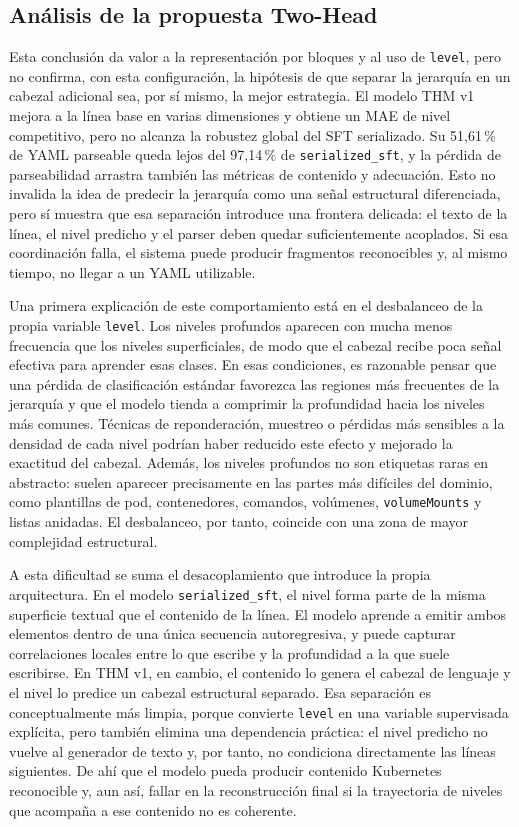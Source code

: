 \subsection{Análisis de la propuesta Two-Head}

Esta conclusión da valor a la representación por bloques y al uso de \texttt{level}, pero
no confirma, con esta configuración, la hipótesis de que separar la jerarquía en un cabezal adicional sea,
por sí mismo, la mejor estrategia. El modelo THM v1 mejora a la línea base en varias
dimensiones y obtiene un MAE de nivel competitivo, pero no alcanza la robustez global del
SFT serializado. Su 51{,}61\,\% de YAML parseable queda lejos del 97{,}14\,\% de
\texttt{serialized\_sft}, y la pérdida de parseabilidad arrastra también las métricas de
contenido y adecuación. Esto no invalida la idea de predecir la jerarquía como una señal
estructural diferenciada, pero sí muestra que esa separación introduce una frontera
delicada: el texto de la línea, el nivel predicho y el parser deben quedar suficientemente
acoplados. Si esa coordinación falla, el sistema puede producir fragmentos reconocibles y,
al mismo tiempo, no llegar a un YAML utilizable.

Una primera explicación de este comportamiento está en el desbalanceo de la propia variable
\texttt{level}. Los niveles profundos aparecen con mucha menos frecuencia que los niveles
superficiales, de modo que el cabezal recibe poca señal efectiva para aprender esas clases.
En esas condiciones, es razonable pensar que una pérdida de clasificación estándar favorezca
las regiones más frecuentes de la jerarquía y que el modelo tienda a comprimir la profundidad
hacia los niveles más comunes. Técnicas de reponderación, muestreo o pérdidas más sensibles a la
densidad de cada nivel podrían haber reducido este efecto y mejorado la exactitud del cabezal. Además, los
niveles profundos no son etiquetas raras en abstracto: suelen aparecer precisamente en las
partes más difíciles del dominio, como plantillas de pod, contenedores, comandos, volúmenes,
\texttt{volumeMounts} y listas anidadas. El desbalanceo, por tanto, coincide con una zona de
mayor complejidad estructural.

A esta dificultad se suma el desacoplamiento que introduce la propia arquitectura. En el modelo
\texttt{serialized\_sft}, el nivel forma parte de la misma superficie textual que el contenido
de la línea. El modelo aprende a emitir ambos elementos dentro de una única secuencia
autoregresiva, y puede capturar correlaciones locales entre lo que escribe y la profundidad a
la que suele escribirse. En THM v1, en cambio, el contenido lo genera el cabezal de lenguaje y
el nivel lo predice un cabezal estructural separado. Esa separación es conceptualmente más
limpia, porque convierte \texttt{level} en una variable supervisada explícita, pero también
elimina una dependencia práctica: el nivel predicho no vuelve al generador de texto y, por
tanto, no condiciona directamente las líneas siguientes. De ahí que el modelo pueda producir
contenido Kubernetes reconocible y, aun así, fallar en la reconstrucción final si la trayectoria
de niveles que acompaña a ese contenido no es coherente.

